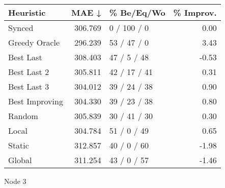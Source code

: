 \begin{tabular}{lrlr}
\toprule
\textbf{Heuristic} & \textbf{MAE ↓} & \textbf{\% Be/Eq/Wo} & \textbf{\% Improv.} \\
\midrule
            Synced &        306.769 &          0 / 100 / 0 &                0.00 \\
     Greedy Oracle &        296.239 &          53 / 47 / 0 &                3.43 \\
         Best Last &        308.403 &          47 / 5 / 48 &               -0.53 \\
       Best Last 2 &        305.811 &         42 / 17 / 41 &                0.31 \\
       Best Last 3 &        304.012 &         39 / 24 / 38 &                0.90 \\
    Best Improving &        304.330 &         39 / 23 / 38 &                0.80 \\
            Random &        305.839 &         30 / 41 / 30 &                0.30 \\
             Local &        304.784 &          51 / 0 / 49 &                0.65 \\
            Static &        312.857 &          40 / 0 / 60 &               -1.98 \\
            Global &        311.254 &          43 / 0 / 57 &               -1.46 \\
\bottomrule
\end{tabular}
\caption{Node 3}
\label{tab:iid_lr05_le2_bs2_3}
